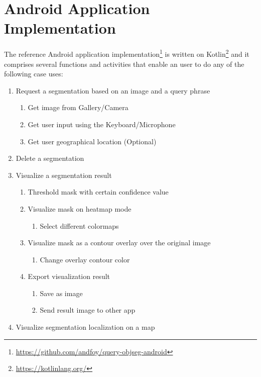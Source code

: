 \section{Android Application Implementation}
The reference Android application implementation\footnote{\url{https://github.com/andfoy/query-objseg-android}} is written on Kotlin\footnote{\url{https://kotlinlang.org/}} and it comprises several functions and activities that enable an user to do any of the following case uses:
\begin{enumerate}
    \item Request a segmentation based on an image and a query phrase \label{case:create}
    \begin{enumerate}
        \item Get image from Gallery/Camera \label{subcase:cam}
        \item Get user input using the Keyboard/Microphone
        \label{subcase:query_input}
        \item Get user geographical location (Optional)
        \label{subcase:gps}
    \end{enumerate}
    \item Delete a segmentation
    \item Visualize a segmentation result
    \begin{enumerate}
        \item Threshold mask with certain confidence value
        \label{subcase:thresh}
        \item Visualize mask on heatmap mode
        \label{subcase:vis_heatmap}
        \begin{enumerate}
            \item Select different colormaps
            \label{subsubcase:colormap}
        \end{enumerate}    
        \item Visualize mask as a contour overlay over the original image
        
        \begin{enumerate}
            \item Change overlay contour color
        \end{enumerate}
        \item Export visualization result
        \begin{enumerate}
            \item Save as image
            \item Send result image to other app
        \end{enumerate}
    \end{enumerate}
    \item Visualize segmentation localization on a map 
\end{enumerate}

